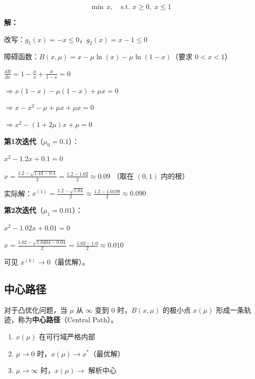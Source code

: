 \begin{example}
\[
\min \, x, \quad \text{s.t. } x \geq 0, \; x \leq 1
\]

\textbf{解：}

改写：$g_1(x) = -x \leq 0$，$g_2(x) = x - 1 \leq 0$

障碍函数：$B(x, \mu) = x - \mu\ln(x) - \mu\ln(1-x)$（要求 $0 < x < 1$）

$\frac{dB}{dx} = 1 - \frac{\mu}{x} + \frac{\mu}{1-x} = 0$

$\Rightarrow x(1-x) - \mu(1-x) + \mu x = 0$

$\Rightarrow x - x^2 - \mu + \mu x + \mu x = 0$

$\Rightarrow x^2 - (1+2\mu)x + \mu = 0$

\textbf{第1次迭代}（$\mu_0 = 0.1$）：

$x^2 - 1.2x + 0.1 = 0$

$x = \frac{1.2 - \sqrt{1.44 - 0.4}}{2} = \frac{1.2 - 1.02}{2} \approx 0.09$
（取在 $(0,1)$ 内的根）

实际解：$x^{(1)} = \frac{1.2 - \sqrt{1.04}}{2} \approx \frac{1.2 - 1.0199}{2} \approx 0.090$

\textbf{第2次迭代}（$\mu_1 = 0.01$）：

$x^2 - 1.02x + 0.01 = 0$

$x = \frac{1.02 - \sqrt{1.0404 - 0.04}}{2} = \frac{1.02 - 1.0}{2} \approx 0.010$

可见 $x^{(k)} \to 0$（最优解）。
\end{example}

\subsection{中心路径}

\begin{definition}[中心路径]
对于凸优化问题，当 $\mu$ 从 $\infty$ 变到 $0$ 时，$B(x, \mu)$ 的极小点 $x(\mu)$ 形成一条轨迹，称为\textbf{中心路径}（Central Path）。
\end{definition}

\begin{theorem}[中心路径的性质]
\begin{enumerate}
    \item $x(\mu)$ 在可行域严格内部
    \item $\mu \to 0$ 时，$x(\mu) \to x^*$（最优解）
    \item $\mu \to \infty$ 时，$x(\mu) \to$ 解析中心
\end{enumerate}
\end{theorem}

